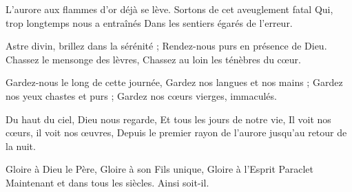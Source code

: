 L'aurore aux flammes d'or déjà se lève.
Sortons de cet aveuglement fatal
Qui, trop longtemps nous a entraînés
Dans les sentiers égarés de l'erreur.

Astre divin, brillez dans la sérénité ;
Rendez-nous purs en présence de Dieu.
Chassez le mensonge des lèvres,
Chassez au loin les ténèbres du cœur.

Gardez-nous le long de cette journée,
Gardez nos langues et nos mains ;
Gardez nos yeux chastes et purs ;
Gardez nos cœurs vierges, immaculés.

Du haut du ciel, Dieu nous regarde,
Et tous les jours de notre vie,
Il voit nos cœurs, il voit nos œuvres,
Depuis le premier rayon de l'aurore jusqu'au retour de la nuit.

Gloire à Dieu le Père,
Gloire à son Fils unique,
Gloire à l'Esprit Paraclet
Maintenant et dans tous les siècles.
Ainsi soit-il.